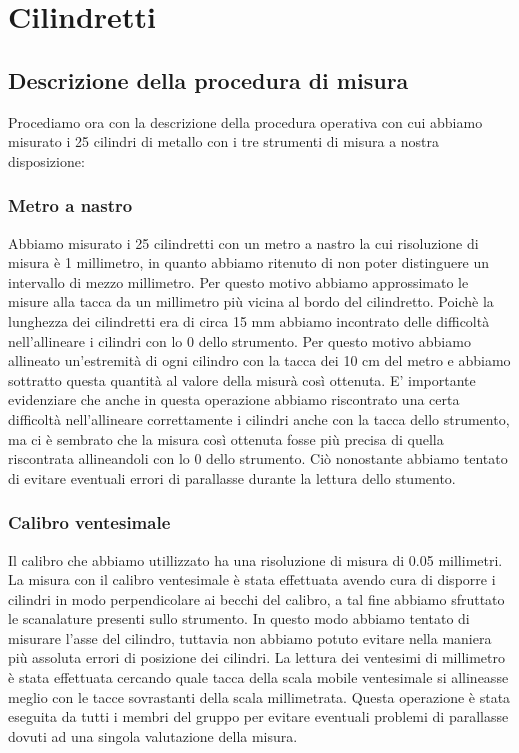 \section{Cilindretti}

\subsection{Descrizione della procedura di misura}
Procediamo ora con la descrizione della procedura operativa con cui
abbiamo misurato i 25 cilindri di metallo con i tre strumenti di
misura a nostra disposizione:

\subsubsection{Metro a nastro}
Abbiamo misurato i 25 cilindretti con un metro a nastro la cui risoluzione
di misura è 1 millimetro, in quanto abbiamo ritenuto di non poter distinguere
un intervallo di mezzo millimetro. Per questo motivo abbiamo approssimato
le misure alla tacca da un millimetro più vicina al bordo del cilindretto.
Poichè la lunghezza dei cilindretti era di circa 15 mm abbiamo incontrato
delle difficoltà nell'allineare i cilindri con lo 0 dello strumento.
Per questo motivo abbiamo allineato un'estremità di ogni cilindro con la
tacca dei 10 cm del metro e abbiamo sottratto questa quantità al valore
della misurà così ottenuta. E' importante evidenziare che anche in questa
operazione abbiamo riscontrato una certa difficoltà nell'allineare correttamente
i cilindri anche con la tacca dello strumento, ma ci è sembrato che la
misura così ottenuta fosse più precisa di quella riscontrata allineandoli
con lo 0 dello strumento. Ciò nonostante abbiamo tentato di evitare
eventuali errori di parallasse durante la lettura dello stumento.

\subsubsection{Calibro ventesimale}
Il calibro che abbiamo utillizzato ha una risoluzione di misura di 0.05
millimetri. La misura con il calibro ventesimale è stata effettuata avendo
cura di disporre i cilindri in modo perpendicolare ai becchi del calibro,
a tal fine abbiamo sfruttato le scanalature presenti sullo strumento.
In questo modo abbiamo tentato di misurare l'asse del cilindro, tuttavia
non abbiamo potuto evitare nella maniera più assoluta errori di posizione
dei cilindri.
La lettura dei ventesimi di millimetro è stata effettuata cercando quale
tacca della scala mobile ventesimale si allineasse meglio con le tacce
sovrastanti della scala millimetrata. Questa operazione è stata eseguita
da tutti i membri del gruppo per evitare eventuali problemi di parallasse
dovuti ad una singola valutazione della misura.

